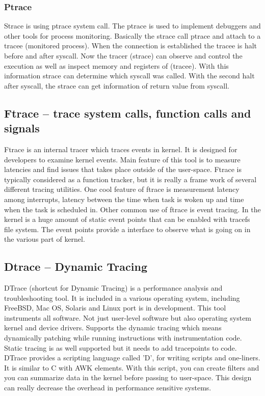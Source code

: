 \subsubsection{Ptrace}
Strace is using ptrace\cite{ptrace_man} system call.
The ptrace is used to  implement debuggers and other tools for process monitoring.
Basically the strace call ptrace and attach to a tracee (monitored process).
When the connection is established the tracee is halt before and after syscall.
Now the tracer (strace) can observe and control the execution as well as inspect memory and registers of (tracee).
With this information strace can determine which syscall was called.
With the second halt after syscall, the strace can get information of return value from syscall.

\subsection{Ftrace -- trace system calls, function calls and signals}
Ftrace\cite{ftrace_man} is an internal tracer which traces events in kernel.
It is designed for developers to examine kernel events. 
Main feature of this tool is to measure latencies and find issues that takes place outside of the user-space.
Ftrace is typically considered as a function tracker, but it is really a frame work of several different tracing utilities.
One cool feature of ftrace is measurement latency among interrupts, latency between the time when task is woken up and time when the task is scheduled in.
Other common use of ftrace is event tracing.
In the kernel is a huge amount of static event points that can be enabled with tracefs file system. 
The event points provide a interface to observe what is going on in the various part of kernel.

\subsection{Dtrace -- Dynamic Tracing}
DTrace\cite{dtrace_man}\cite{dtrace_about} (shortcut for Dynamic Tracing) is a performance analysis and troubleshooting tool.
It is included in a various operating system, including FreeBSD, Mac OS, Solaris and Linux port is in development.
This tool instruments all software.
Not just user-level software but also operating system kernel and device drivers.
Supports the dynamic tracing which means dynamically patching while running instructions with instrumentation code.
Static tracing is as well supported but it needs to add tracepoints to code.
DTrace provides a scripting language called 'D', for writing scripts and one-liners.
It is similar to C with AWK elements.
With this script, you can create filters and you can summarize data in the kernel before passing to user-space.
This design can really decrease the overhead in performance sensitive systems.

